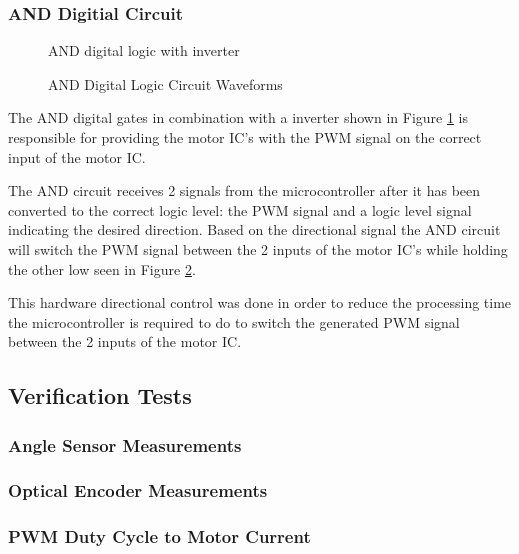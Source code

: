 \subsubsection{AND Digitial Circuit}
\begin{figure}[h]
	\centering
	
	\caption{AND digital logic with inverter}
	\label{fig:andCircuit}
\end{figure}

\begin{figure}[h]
	\centering
	
	\caption{AND Digital Logic Circuit Waveforms}
	\label{fig:andCircuit_waveform}
\end{figure}

The AND digital gates in combination with a inverter shown in Figure \ref{fig:andCircuit} is responsible for providing the motor IC's with the PWM signal on the correct input of the motor IC.

The AND circuit receives 2 signals from the microcontroller  after it has been converted to the correct logic level: the PWM signal and a logic level signal indicating the desired direction. Based on the directional signal the AND circuit will switch the PWM signal between the 2 inputs of the motor IC's while holding the other low seen in Figure \ref{fig:andCircuit_waveform}.

This hardware directional control was done in order to reduce the processing time the microcontroller is required to do to switch the generated PWM signal between the 2 inputs of the motor IC.

\subsection{Verification Tests}

\subsubsection{Angle Sensor Measurements}

\subsubsection{Optical Encoder Measurements}

\subsubsection{ PWM Duty Cycle to Motor Current}

